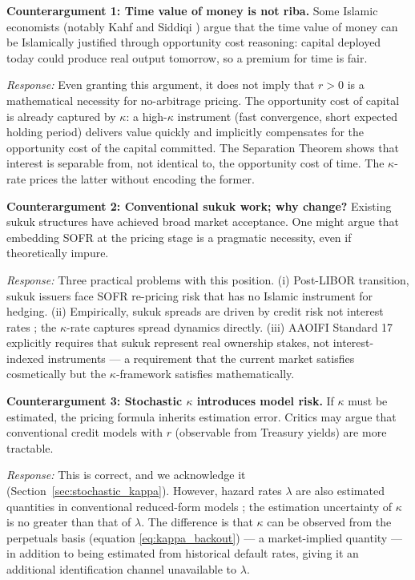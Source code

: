 \documentclass[10pt,twocolumn]{article}
\theoremstyle{plain}
\theoremstyle{definition}
\begin{document}
\textbf{Counterargument 1: Time value of money is not riba.}
Some Islamic economists (notably Kahf \cite{Kahf1994} and
Siddiqi \cite{Siddiqi2004}) argue that the time value of money
can be Islamically justified through opportunity cost reasoning:
capital deployed today could produce real output tomorrow, so
a premium for time is fair.

\textit{Response:} Even granting this argument, it does not imply
that $r > 0$ is a mathematical necessity for no-arbitrage pricing.
The opportunity cost of capital is already captured by $\kappa$:
a high-$\kappa$ instrument (fast convergence, short expected holding
period) delivers value quickly and implicitly compensates for the
opportunity cost of the capital committed. The Separation Theorem
shows that interest is separable from, not identical to, the
opportunity cost of time. The $\kappa$-rate prices the latter
without encoding the former.

\textbf{Counterargument 2: Conventional sukuk work; why change?}
Existing sukuk structures have achieved broad market acceptance.
One might argue that embedding SOFR at the pricing stage is a
pragmatic necessity, even if theoretically impure.

\textit{Response:} Three practical problems with this position.
(i) Post-LIBOR transition, sukuk issuers face SOFR re-pricing
risk that has no Islamic instrument for hedging. (ii) Empirically,
sukuk spreads are driven by credit risk not interest rates
\cite{Reboredo2021,Hassan2021}; the $\kappa$-rate captures spread
dynamics directly. (iii) AAOIFI Standard 17 explicitly requires
that sukuk represent real ownership stakes, not interest-indexed
instruments --- a requirement that the current market satisfies
cosmetically but the $\kappa$-framework satisfies mathematically.

\textbf{Counterargument 3: Stochastic $\kappa$ introduces model risk.}
If $\kappa$ must be estimated, the pricing formula inherits estimation
error. Critics may argue that conventional credit models with $r$
(observable from Treasury yields) are more tractable.

\textit{Response:} This is correct, and we acknowledge it
(Section~\ref{sec:stochastic_kappa}). However, hazard rates $\lambda$
are also estimated quantities in conventional reduced-form models
\cite{DuffieSingleton2003,BieleckiRutkowski2002}; the estimation
uncertainty of $\kappa$ is no greater than that of $\lambda$.
The difference is that $\kappa$ can be observed from the perpetuals
basis (equation \ref{eq:kappa_backout}) --- a market-implied quantity
--- in addition to being estimated from historical default rates,
giving it an additional identification channel unavailable to $\lambda$.
\end{document}
